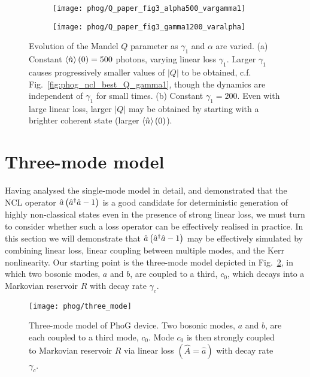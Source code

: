 \begin{figure}[htp]
\centering
	\begin{subfigure}{0.6\linewidth}
	\centering
	\caption{}
	\texttt{[image: phog/Q\_paper\_fig3\_alpha500\_vargamma1]}
	\end{subfigure}
	\begin{subfigure}{0.6\linewidth}
	\centering
	\caption{}
	\texttt{[image: phog/Q\_paper\_fig3\_gamma1200\_varalpha]}
	\end{subfigure}
\caption{\label{fig:phog_fig3paper2} Evolution of the Mandel $Q$ parameter as $\gamma_1$ and $\alpha$ are varied. (a) Constant $\ev{\hat{n}}\left(0\right) = 500$ photons, varying linear loss $\gamma_1$. Larger $\gamma_1$ causes progressively smaller values of $\left|Q\right|$ to be obtained, c.f. Fig.~\ref{fig:phog_ncl_best_Q_gamma1}, though the dynamics are independent of $\gamma_1$ for small times. (b) Constant $\gamma_1 = 200$. Even with large linear loss, larger $\left|Q\right|$ may be obtained by starting with a brighter coherent state (larger $\ev{\hat{n}}\left(0\right)$).}
\end{figure}



\clearpage
\section{Three-mode model}\label{sec:phog_three_mode_model}
Having analysed the single-mode model in detail, and demonstrated that the NCL operator $\hat{a}\left(\hat{a}^\dagger \hat{a} - 1\right)$ is a good candidate for deterministic generation of highly non-classical states even in the presence of strong linear loss, we must turn to consider whether such a loss operator can be effectively realised in practice. In this section we will demonstrate that $\hat{a}\left(\hat{a}^\dagger \hat{a} - 1\right)$ may be effectively simulated by combining linear loss, linear coupling between multiple modes, and the Kerr nonlinearity. Our starting point is the three-mode model depicted in Fig.~\ref{fig:phog_three_mode}, in which two bosonic modes, $a$ and $b$, are coupled to a third, $c_0$, which decays into a Markovian reservoir $R$ with decay rate $\gamma_c$. 

\begin{figure}[htp]
\centering
\texttt{[image: phog/three\_mode]}
\caption{\label{fig:phog_three_mode} Three-mode model of PhoG device. Two bosonic modes, $a$ and $b$, are each coupled to a third mode, $c_0$. Mode $c_0$ is then strongly coupled to Markovian reservoir $R$ via linear loss $\left(\hat{A} = \hat{a}\right)$ with decay rate $\gamma_c$. }
\end{figure}

